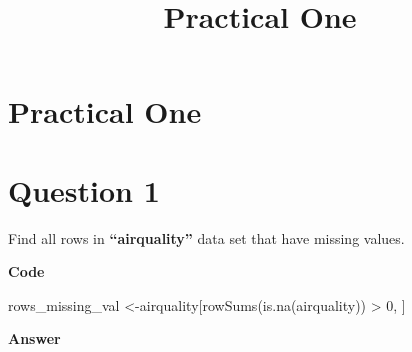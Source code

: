 \documentclass[
  letterpaper,
]{book}
\title{Practical One}
\author{}
\date{}
\newenvironment{Shaded}{\begin{snugshade}}{\end{snugshade}}
\newcommand{\DecValTok}[1]{\textcolor[rgb]{0.68,0.00,0.00}{#1}}
\newcommand{\FunctionTok}[1]{\textcolor[rgb]{0.28,0.35,0.67}{#1}}
\newcommand{\NormalTok}[1]{\textcolor[rgb]{0.00,0.23,0.31}{#1}}
\newcommand{\OtherTok}[1]{\textcolor[rgb]{0.00,0.23,0.31}{#1}}
\newcommand{\SpecialCharTok}[1]{\textcolor[rgb]{0.37,0.37,0.37}{#1}}
\renewcommand*\contentsname{Table of contents}
\newcommand\contentsname{Table of contents}
\begin{document}
\frontmatter
\maketitle

\renewcommand*\contentsname{Table of contents}
{
\setcounter{tocdepth}{1}
\tableofcontents
}

\mainmatter
{}

\chapter{Practical One}\label{practical-one}


\chapter{}\label{section}

\chapter*{Question 1}

Find all rows in \textbf{``airquality''} data set that have missing
values.

\textbf{Code}

\begin{Shaded}
\begin{Highlighting}[]
\NormalTok{rows\_missing\_val }\OtherTok{\textless{}{-}}\NormalTok{airquality[}\FunctionTok{rowSums}\NormalTok{(}\FunctionTok{is.na}\NormalTok{(airquality)) }\SpecialCharTok{\textgreater{}} \DecValTok{0}\NormalTok{, ]}
\end{Highlighting}
\end{Shaded}

\textbf{Answer}
\end{document}
